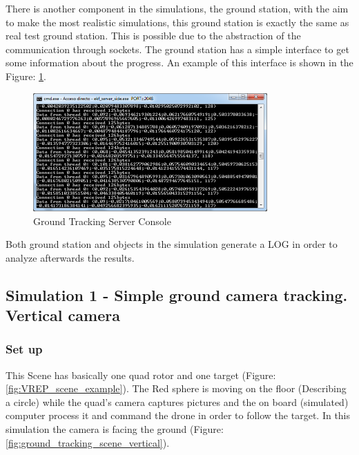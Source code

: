 There is another component in the simulations, the ground station, with the aim to make the most realistic simulations, this ground station is exactly the same as real test ground station. This is possible due to the abstraction of the communication through sockets. The ground station has a simple interface to get some information about the progress. An example of this interface is shown in the Figure: \ref{fig:Ground_Tracking_Server_Console}.

\begin{figure}[ht]
	\centering
	\includegraphics[width=0.8\textwidth,natwidth=677,natheight=342]{../Images/c3/ground_tracking_server_console.png}
	\caption{Ground Tracking Server Console}
	\label{fig:Ground_Tracking_Server_Console}
\end{figure}

Both ground station and objects in the simulation generate a LOG in order to analyze afterwards the results.

\subsection{Simulation 1 - Simple ground camera tracking. Vertical camera}
\subsubsection{Set up}
This Scene has basically one quad rotor and one target (Figure: \ref{fig:VREP_scene_example}). The Red sphere is moving on the floor (Describing a circle) while the quad's camera captures pictures and the on board (simulated) computer process it and command the drone in order to follow the target. In this simulation the camera is facing the ground (Figure: \ref{fig:ground_tracking_scene_vertical}).

